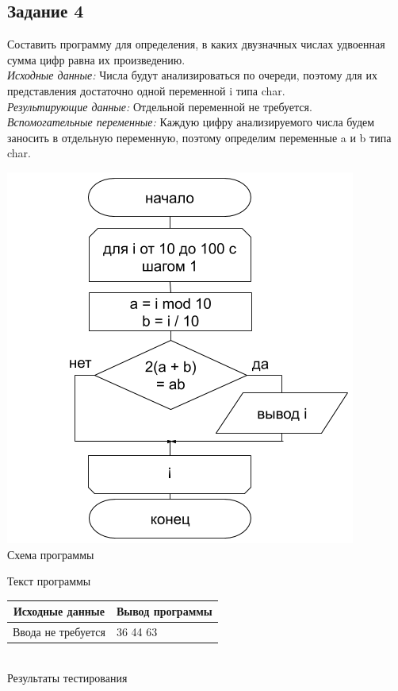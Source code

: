 \documentclass[a4paper,14pt]{extarticle}
\begin{document}
\subsection{Задание 4}
Составить программу для определения, в каких двузначных числах удвоенная сумма цифр равна их произведению.\\
\textit{Исходные данные:} Числа будут анализироваться по очереди, поэтому для их представления достаточно одной переменной i типа char.\\
\textit{Результирующие данные:} Отдельной переменной не требуется.\\
\textit{Вспомогательные переменные:}  Каждую цифру анализируемого числа будем заносить в отдельную переменную, поэтому определим переменные a и b типа char.
\begin{center}
\includegraphics[scale=0.6]{lab2-4.png}\\
Схема программы
\end{center}

\begin{center}
Текст программы
\end{center}
\begin{center}
\begin{tabular}{|p{7cm}|p{7cm}|}
\hline
\multicolumn{1}{|c|}{Исходные данные}& \multicolumn{1}{|c|}{Вывод программы}\\
\hline
Ввода не требуется & 36 44 63\\
\hline
\end{tabular}\\
\vspace{0.3cm}
Результаты тестирования
\end{center}
\end{document}

